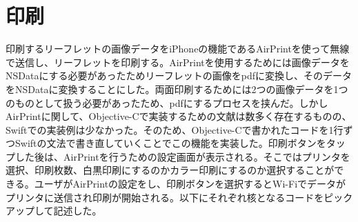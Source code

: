\section{印刷}
印刷するリーフレットの画像データをiPhoneの機能であるAirPrintを使って無線で送信し、リーフレットを印刷する。AirPrintを使用するためには画像データをNSDataにする必要があったためリーフレットの画像をpdfに変換し、そのデータをNSDataに変換することにした。両面印刷するためには2つの画像データを1つのものとして扱う必要があったため、pdfにするプロセスを挟んだ。しかしAirPrintに関して、Objective-Cで実装するための文献は数多く存在するものの、Swiftでの実装例は少なかった。そのため、Objective-Cで書かれたコードを1行ずつSwiftの文法で書き直していくことでこの機能を実装した。印刷ボタンをタップした後は、AirPrintを行うための設定画面が表示される。そこではプリンタを選択、印刷枚数、白黒印刷にするのかカラー印刷にするのか選択することができる。ユーザがAirPrintの設定をし、印刷ボタンを選択するとWi-Fiでデータがプリンタに送信され印刷が開始される。以下にそれぞれ核となるコードをピックアップして記述した。
